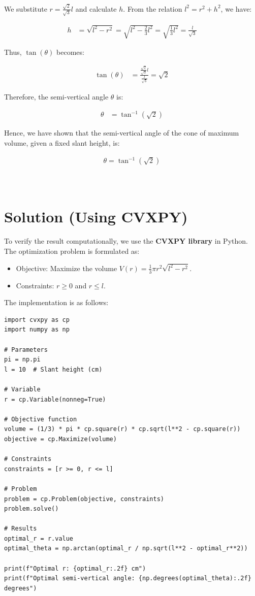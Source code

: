 \documentclass[journal]{IEEEtran}
\begin{document}
We substitute \( r = \frac{\sqrt{2}}{\sqrt{3}} l \) and calculate \( h \). From the relation \( l^2 = r^2 + h^2 \), we have:

\begin{align}
h &= \sqrt{l^2 - r^2} = \sqrt{l^2 - \frac{2}{3} l^2} = \sqrt{\frac{1}{3} l^2} = \frac{l}{\sqrt{3}}
\end{align}

Thus, \( \tan(\theta) \) becomes:

\begin{align}
\tan(\theta) &= \frac{\frac{\sqrt{2}}{\sqrt{3}} l}{\frac{l}{\sqrt{3}}} = \sqrt{2}
\end{align}

Therefore, the semi-vertical angle \( \theta \) is:

\begin{align}
\theta &= \tan^{-1}(\sqrt{2})
\end{align}

Hence, we have shown that the semi-vertical angle of the cone of maximum volume, given a fixed slant height, is:

\begin{align}
\boxed{\theta = \tan^{-1}(\sqrt{2})}
\end{align}
\\ \\

\section*{Solution (Using CVXPY)}
To verify the result computationally, we use the \textbf{CVXPY library} in Python. The optimization problem is formulated as:

\begin{itemize}
    \item Objective: Maximize the volume \( V(r) = \frac{1}{3} \pi r^2 \sqrt{l^2 - r^2} \).
    \item Constraints: \( r \geq 0 \) and \( r \leq l \).
\end{itemize}

The implementation is as follows:

\begin{verbatim}
import cvxpy as cp
import numpy as np

# Parameters
pi = np.pi
l = 10  # Slant height (cm)

# Variable
r = cp.Variable(nonneg=True)

# Objective function
volume = (1/3) * pi * cp.square(r) * cp.sqrt(l**2 - cp.square(r))
objective = cp.Maximize(volume)

# Constraints
constraints = [r >= 0, r <= l]

# Problem
problem = cp.Problem(objective, constraints)
problem.solve()

# Results
optimal_r = r.value
optimal_theta = np.arctan(optimal_r / np.sqrt(l**2 - optimal_r**2))

print(f"Optimal r: {optimal_r:.2f} cm")
print(f"Optimal semi-vertical angle: {np.degrees(optimal_theta):.2f} degrees")
\end{verbatim}
\end{document}
